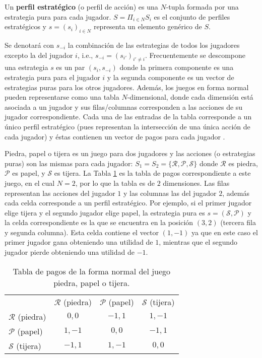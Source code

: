\begin{definition} Un \textbf{perfil estratégico} (o perfil de acción) es una $N$-tupla formada por una estrategia pura para cada jugador. $S = \Pi_{i \in N}S_i$ es el conjunto de perfiles estratégicos y $s = (s_i)_{i \in N}$ representa un elemento genérico de $S$.  
\end{definition}

Se denotará con $s_{-i}$ la combinación de las estrategias de todos los jugadores excepto la del jugador $i$, i.e., $s_{-i} = (s_{i'})_{i' \neq i}$. Frecuentemente se descompone una estrategia $s$ es un par $(s_i,s_{-i})$ donde la primera componente es una estrategia pura para el jugador $i$ y la segunda componente es un vector de estrategias puras para los otros jugadores. Además, los juegos en forma normal pueden representarse como una tabla $N$-dimensional, donde cada dimensión está asociada a un jugador y sus filas/columnas corresponden a las acciones de su jugador correspondiente. Cada una de las entradas de la tabla corresponde a un único perfil estratégico (pues representan la intersección de una única acción de cada jugador) y éstas contienen un vector de pagos para cada jugador \cite{bib:introductionCFR}.

Piedra, papel o tijera es un juego para dos jugadores y las acciones (o estrategias puras) son las mismas para cada jugador: $S_1 = S_2 = \{\mathcal{R}, \mathcal{P}, \mathcal{S} \}$ donde $\mathcal{R}$ es piedra, $\mathcal{P}$ es papel, y $\mathcal{S}$ es tijera. La Tabla \ref{table:pago-RPS} es la tabla de pagos correspondiente a este juego, en el cual $N = 2$, por lo que la tabla es de $2$ dimensiones. Las filas representan las acciones del jugador $1$ y las columnas las del jugador $2$, además cada celda corresponde a un perfil estratégico. Por ejemplo, si el primer jugador elige tijera y el segundo jugador elige papel, la estrategia pura es $s = (\mathcal{S}, \mathcal{P})$ y la celda correspondiente es la que se encuentra en la posición $(3, 2)$ (tercera fila y segunda columna). Esta celda contiene el vector $(1, -1)$ ya que en este caso el primer jugador gana obteniendo una utilidad de $1$, mientras que el segundo jugador pierde obteniendo una utilidad de $-1$.

\begin{table}[h]
\begin{center}
\caption{Tabla de pagos de la forma normal del juego piedra, papel o tijera.}
\label{table:pago-RPS}
\begin{tabular}{l |c | c | c |}
  \multicolumn{1}{c}{} & \multicolumn{1}{c}{$\mathcal{R}$ (piedra)} & \multicolumn{1}{c}{$\mathcal{P}$ (papel)} & \multicolumn{1}{c}{$\mathcal{S}$ (tijera)} \\ \cline{2-4}
$\mathcal{R}$ (piedra) & $0,0$ & $-1,1$ & $1,-1$ \\ \cline{2-4}
$\mathcal{P}$ (papel) & $1,-1$ & $0,0$ & $-1,1$ \\ \cline{2-4}
$\mathcal{S}$ (tijera) & $-1,1$ & $1,-1$ & $0,0$ \\ \cline{2-4}
\end{tabular}
\end{center}
\end{table}

